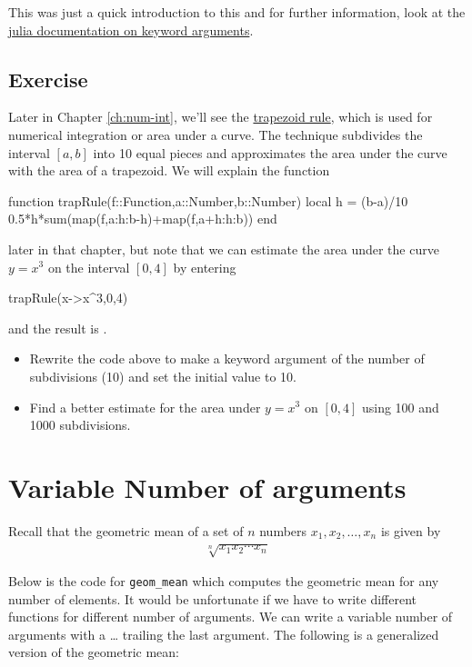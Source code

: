 This was just a quick introduction to this and for further information, look at the \href{https://docs.julialang.org/en/v1/manual/functions/#Keyword-Arguments-1}{julia documentation on keyword arguments}. 


\subsection{Exercise}

Later in Chapter \ref{ch:num-int}, we'll see the \href{https://en.wikipedia.org/wiki/Trapezoidal_rule}{trapezoid rule}, which is used for numerical integration or area under a curve.  The technique subdivides the interval $[a,b]$ into 10 equal pieces and approximates the area under the curve with the area of a trapezoid.  We will explain the function
\begin{jlblock}[adf]
function trapRule(f::Function,a::Number,b::Number)
  local h = (b-a)/10
    0.5*h*sum(map(f,a:h:b-h)+map(f,a+h:h:b))
end
\end{jlblock}
later in that chapter, but note that we can estimate the area under the curve $y=x^3$ on the interval $[0,4]$ by entering
\begin{jlblock}[adf]
trapRule(x->x^3,0,4)
\end{jlblock}
%
and the result is \printpythontex[verb]. 

\begin{itemize}
\item Rewrite the code above to make a keyword argument of the number of subdivisions (10) and set the initial value to 10. 
\item Find a better estimate for the area under $y=x^3$ on $[0,4]$ using 100 and 1000 subdivisions.
\end{itemize}



\section{Variable Number of arguments}

Recall that the geometric mean of a set of $n$ numbers $x_1,x_2, \ldots, x_n$ is given by
%
\begin{align*}
\sqrt[n]{x_1x_2 \cdots x_n}
\end{align*}

Below is the code for \verb!geom_mean! which computes the geometric mean for any number of elements.  It would be unfortunate if we have to write different functions for different number of arguments. We can write a variable number of arguments with a \ldots{} trailing the last argument. The following is a
generalized version of the geometric mean:

